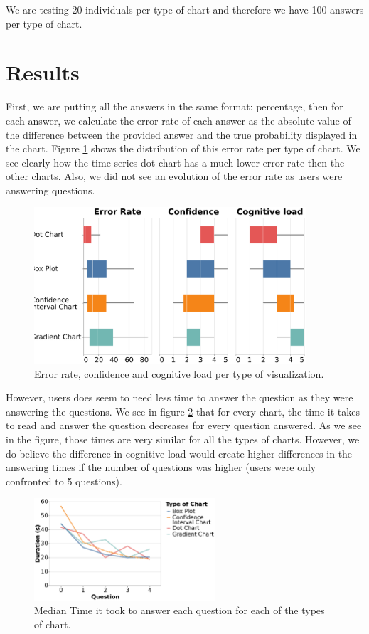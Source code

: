 \documentclass[a4paper,3p,sort&compress]{elsarticle}
\begin{document}
We are testing 20 individuals per type of chart and therefore we have 100 answers per 
type of chart.

\section{Results}
\label{sec:results}

First, we are putting all the answers in the same format: percentage, then for each answer, we calculate the 
error rate of each answer as the absolute value of the difference 
between the provided answer and the true probability displayed in the chart. Figure \ref{figure:errors} shows 
the distribution of this error rate per type of chart. We see clearly how the time series dot chart
has a much lower error rate then the other charts. Also, we did not see an evolution of the error rate as 
users were answering questions.

\begin{figure}
  \charts
  \includegraphics[width=0.9\textwidth]{comparison}
  \caption{\label{figure:errors}Error rate, confidence and cognitive load per type of visualization.}
\end{figure}

However, users does seem to need less time to answer the question as they were answering the questions. 
We see in figure \ref{figure:duration} that for every chart, the time it takes 
to read and answer the question decreases for every question answered. As we see in the figure, those times 
are very similar for all the types of charts. However, we do believe the difference in cognitive load would 
create higher differences in the answering times if the number of questions was higher (users were only confronted
to 5 questions).

\begin{figure}
  \centering
   \includegraphics[width=0.6\textwidth]{duration_evo2}
  \caption{\label{figure:duration} Median Time it took to answer each question for each of the types of chart.}
\end{figure}  
\end{document}
